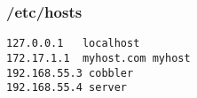 
\begin{frame}[fragile]
  \frametitle{/etc/hosts}

\begin{lstlisting}
127.0.0.1   localhost 
172.17.1.1  myhost.com myhost
192.168.55.3 cobbler
192.168.55.4 server
\end{lstlisting}



\end{frame}
